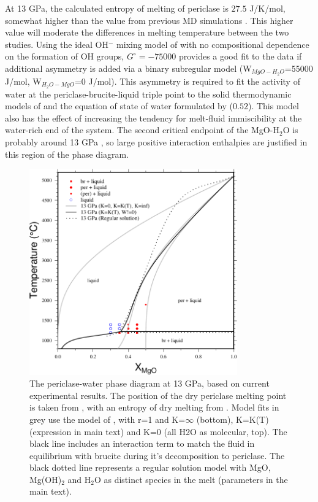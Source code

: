 \documentclass[review]{elsarticle}
\begin{document}
At 13 GPa, the calculated entropy of melting of periclase is $27.5$ J/K/mol, somewhat higher than the value from previous MD simulations \cite[$\sim$22 J/K/mol][]{CG1994}. This higher value will moderate the differences in melting temperature between the two studies. Using the ideal OH$^-$ mixing model of \cite{SS1985} with no compositional dependence on the formation of OH groups, $G^{\circ}= -75000$ provides a good fit to the data if additional asymmetry is added via a binary subregular model (W$_{MgO-H_2O}$=55000 J/mol, W$_{H_2O-MgO}$=0 J/mol). This asymmetry is required to fit the activity of water at the periclase-brucite-liquid triple point to the solid thermodynamic models of \citep{HP2011} and the equation of state of water formulated by \cite{PS1995} ($0.52$). This model also has the effect of increasing the tendency for melt-fluid immiscibility at the water-rich end of the system. The second critical endpoint of the MgO-H$_2$O is probably around 13 GPa \citep{MSUP2007}, so large positive interaction enthalpies are justified in this region of the phase diagram. 

\begin{figure}[ht!]
  \centering
      \includegraphics[width=0.8\textwidth]{figures/per-H2O}
  \caption{The periclase-water phase diagram at 13 GPa, based on current experimental results. The position of the dry periclase melting point is taken from \cite{ZF2008}, with an entropy of dry melting from \cite{CG1994}. Model fits in grey use the model of \cite{SS1985}, with r=1 and K=$\infty$ (bottom), K=K(T) (expression in main text) and K=0 (all H2O as molecular, top). The black line includes an interaction term to match the fluid in equilibrium with brucite during it's decomposition to periclase. The black dotted line represents a regular solution model with MgO, Mg(OH)$_2$ and H$_2$O as distinct species in the melt (parameters in the main text).}
  \label{fig:MH}
\end{figure}
\end{document}

